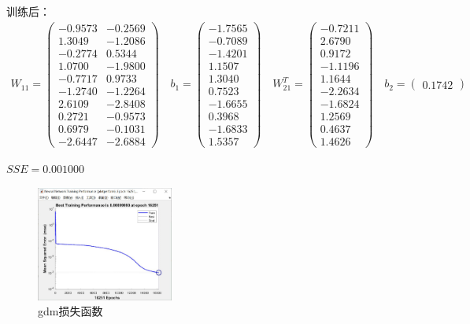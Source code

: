 \documentclass[UTF8]{article}
\begin{document}
训练后：
\begin{equation}
\nonumber
\begin{aligned}
W_{11} = 
\left(
\begin{matrix}
    -0.9573 & -0.2569\\
    1.3049 & -1.2086\\
   -0.2774 &  0.5344\\
    1.0700 & -1.9800\\
   -0.7717 &  0.9733\\
   -1.2740 & -1.2264\\
    2.6109 & -2.8408\\
    0.2721 & -0.9573\\
    0.6979 & -0.1031\\
   -2.6447 & -2.6884
\end{matrix}
\right)
\quad
b_{1} = 
\left(
\begin{matrix}
    -1.7565\\
   -0.7089\\
   -1.4201\\
    1.1507\\
    1.3040\\
    0.7523\\
   -1.6655\\
    0.3968\\
   -1.6833\\
    1.5357
\end{matrix}
\right)
\quad
W_{21}^T = 
\left(
\begin{matrix}
    -0.7211\\ 2.6790\\  0.9172\\ -1.1196\\ 1.1644\\-2.2634\\-1.6824\\1.2569\\ 0.4637 \\ 1.4626
\end{matrix}
\right)
\quad
b_{2} = 
\left(
\begin{matrix}
    0.1742
\end{matrix}
\right)
\end{aligned}
\end{equation}
\begin{center}
$SSE = 0.001000$
\end{center}
\begin{figure}[H]
\centering
    \includegraphics[width=0.4\textwidth]{gdm.jpg}
    \caption[0.3\textwidth]{gdm损失函数}
\end{figure}
\end{document}
